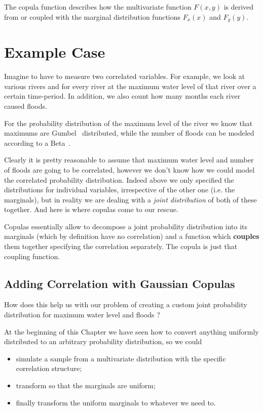 The copula function describes how the multivariate function $F(x,y)$ is derived from or coupled with the marginal distribution functions $F_x(x)$ and $F_y(y)$.


\section{Example Case}
\label{example-problem-case}

Imagine to have to measure two correlated variables. For example, we look at various rivers and for every river at the maximum water level of that river over a certain time-period. In addition, we also count how many months each river caused floods.

For the probability distribution of the maximum level of the river we know that maximums are Gumbel~\cite{bib:gumbel} distributed, while the number of floods can be modeled according to a Beta~\cite{bib:eta}.

Clearly it is pretty reasonable to assume that maximum water level and number of floods are going to be correlated, however we don't know how we could model the correlated probability distribution.
Indeed above we only specified the distributions for individual variables, irrespective of the other one (i.e. the marginals), but in reality we are dealing with a \emph{joint distribution} of both of these together. And here is where copulas come to our rescue.

Copulas essentially allow to decompose a joint probability distribution into its marginals (which by definition have no correlation) and a function which \textbf{couples} them together specifying the correlation separately. The copula is just that coupling function.

\subsection{Adding Correlation with Gaussian Copulas}
\label{adding-correlation-with-gaussian-copulas}

How does this help us with our problem of creating a custom joint probability distribution for maximum water level and floods ?

At the beginning of this Chapter we have seen how to convert anything uniformly distributed to an arbitrary probability distribution, so we could
\begin{itemize}
\tightlist
\item
  simulate a sample from a multivariate distribution with the specific correlation structure;
\item
  transform so that the marginals are uniform;
\item
  finally transform the uniform marginals to whatever we need to.
\end{itemize}

